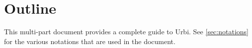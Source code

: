
\section{Outline}

This multi-part document provides a complete guide to Urbi.  See
\autoref{sec:notations} for the various notations that are used in the
document.

\newenvironment{partDescription}[2]
{%
  \item[\autoref{#1} --- \nameref{#1}]~\\%
  #2
  \begin{description}%
    \let\itemOrig\item%
    \renewcommand{\item}[1][]{\itemOrig[~~\autoref{##1} --- \nameref{##1}]~\\}%
  }{%
  \end{description}%
}

\begin{description}




{
  
}

\end{description}

